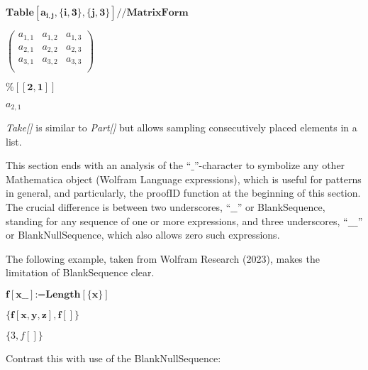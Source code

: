 \documentclass{article}
\begin{document}
\begin{doublespace}
\noindent\(\pmb{\text{Table}\left[a_{i,j}, \{i,3\},\{j,3\}\right] \text{//} \text{MatrixForm}}\)
\end{doublespace}

\begin{doublespace}
\noindent\(\left(
\begin{array}{ccc}
 a_{1,1} & a_{1,2} & a_{1,3} \\
 a_{2,1} & a_{2,2} & a_{2,3} \\
 a_{3,1} & a_{3,2} & a_{3,3} \\
\end{array}
\right)\)
\end{doublespace}

\begin{doublespace}
\noindent\(\pmb{\%[[2,1]]}\)
\end{doublespace}

\begin{doublespace}
\noindent\(a_{2,1}\)
\end{doublespace}

\textit{ Take[] }is similar to \textit{ Part[] }but allows sampling consecutively placed elements in a list.

This section ends with an analysis of the {``}$\_${''}-character to symbolize any other Mathematica object (Wolfram Language expressions), which
is useful for patterns in general, and particularly, the proofID function at the beginning of this section. The crucial difference is between two
underscores, {``}$\_\_${''} or BlankSequence, standing for any sequence of one or more expressions, and three underscores, {``}$\_\_\_${''} or BlankNullSequence,
which also allows zero such expressions.

The following example, taken from Wolfram Research (2023), makes the limitation of BlankSequence clear.

\begin{doublespace}
\noindent\(\pmb{f[\text{x$\_\_$}]\text{:=}\text{Length}[\{x\}]}\)
\end{doublespace}

\begin{doublespace}
\noindent\(\pmb{\{f[x,y,z],f[]\}}\)
\end{doublespace}

\begin{doublespace}
\noindent\(\{3,f[]\}\)
\end{doublespace}

Contrast this with use of the BlankNullSequence:
\end{document}
